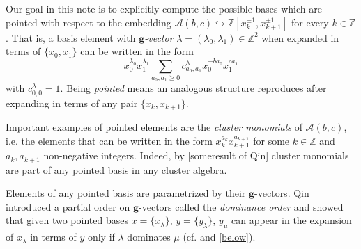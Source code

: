 \documentclass{amsart}
\numberwithin{theorem}{section}
\newcommand{\bfg}{\boldsymbol{g}}
\newcommand{\cA}{\mathcal{A}}
\newcommand{\ZZ}{\mathbb{Z}}
\newcommand{\into}{\hookrightarrow}
\begin{document}
  Our goal in this note is to explicitly compute the possible bases which are pointed with respect to the embedding $\cA(b,c)\into\ZZ[x_k^{\pm1},x_{k+1}^{\pm1}]$ for every $k\in\ZZ$.
  That is, a basis element with \emph{$\bfg$-vector} $\lambda=(\lambda_0,\lambda_1)\in\ZZ^2$ when expanded in terms of $\{x_0,x_1\}$ can be written in the form
  \begin{equation}
    \label{eq:pointed}
    x_0^{\lambda_0}x_1^{\lambda_1}\sum\limits_{a_0,a_1 \ge 0} c^\lambda_{a_0,a_1} x_0^{-ba_0} x_1^{ca_1}
  \end{equation}
  with $c^\lambda_{0,0}=1$.
  Being \emph{pointed} means an analogous structure reproduces after expanding in terms of any pair $\{x_k,x_{k+1}\}$.

  Important examples of pointed elements are the \emph{cluster monomials} of $\cA(b,c)$, i.e. the elements that can be written in the form $x_k^{a_k}x_{k+1}^{a_{k+1}}$ for some $k\in\ZZ$ and $a_k,a_{k+1}$ non-negative integers.
  Indeed, by [someresult of Qin] cluster monomials are part of any pointed basis in any cluster algebra.

  Elements of any pointed basis are parametrized by their $\bfg$-vectors.
  Qin introduced a partial order on $\bfg$-vectors called the \emph{dominance order} and showed that given two pointed bases $x=\{x_\lambda\}$, $y=\{y_\lambda\}$, $y_\mu$ can appear in the expansion of $x_\lambda$ in terms of $y$ only if $\lambda$ dominates $\mu$ (cf. \cite[Mainthm]{Qin} and \ref{below}).
\end{document}
